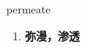 
\begin{frame}
{\huge permeate}
\begin{center}
\begin{enumerate}\Large
  \item \textbf{弥漫，渗透}
\end{enumerate}
\end{center}
\end{frame}
